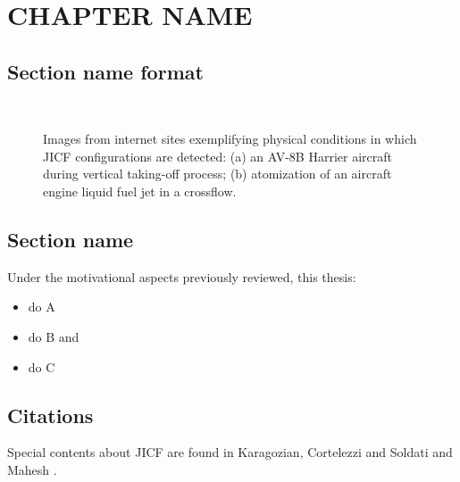 \chapter{\textbf{CHAPTER NAME}}
\label{chap:chapname}

\lipsum[1]

\section{\textbf{Section name format}} 
\label{sec:secname}

\lipsum[2-3]
\begin{figure}
\centering	
		\centering
		\hspace{0.2cm}
		 \\
		\bigskip
\caption[Images from internet sites exemplifying physical conditions in which JICF configurations are detected]{\label{fig:jicf-examples}Images from internet sites exemplifying physical conditions in which JICF configurations are detected: (a) an AV-8B Harrier aircraft during vertical taking-off process; (b) atomization of an aircraft engine liquid fuel jet in a crossflow.}
\end{figure}

\lipsum[1-4]

\section{\textbf{Section name}}

Under the motivational aspects previously reviewed, this thesis:
\begin{itemize}
\item do A
\item do B and
\item do C
\end{itemize}


\section{\textbf{Citations}}

Special contents about JICF are found in Karagozian, Cortelezzi and Soldati \cite{KaragozianBook2003} and Mahesh \cite{Mahesh2013}. 
